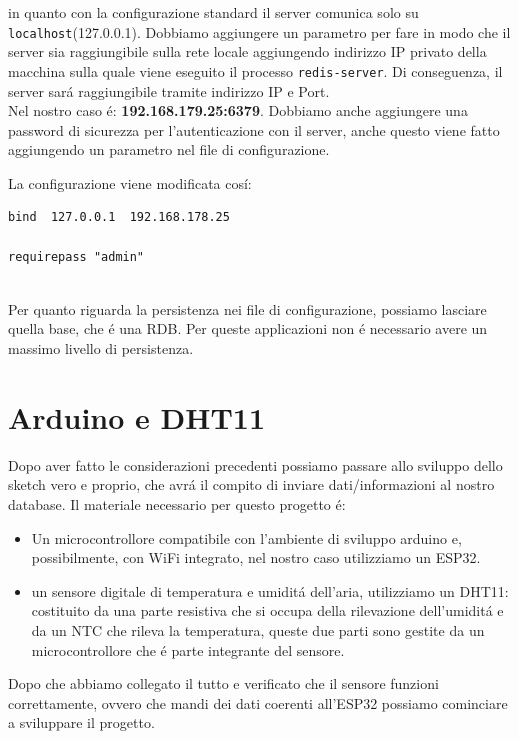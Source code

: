 in quanto con la configurazione standard il server comunica solo su \texttt{localhost}(127.0.0.1).
Dobbiamo aggiungere un parametro per fare in modo che il server sia raggiungibile sulla rete locale aggiungendo indirizzo IP
privato della macchina sulla quale viene eseguito il processo \texttt{redis-server}.
Di conseguenza, il server sará raggiungibile tramite indirizzo IP e Port.\\
Nel nostro caso é: \textbf{192.168.179.25:6379}.
Dobbiamo anche aggiungere una password di sicurezza per l'autenticazione con il server, anche questo viene fatto
aggiungendo un parametro nel file di configurazione.

La configurazione viene modificata cosí:
\begin{lstlisting}[autogobble]
bind  127.0.0.1  192.168.178.25

requirepass "admin"\end{lstlisting}

\\

Per quanto riguarda la persistenza nei file di configurazione, possiamo lasciare quella base, che é una RDB.
Per queste applicazioni non é necessario avere un massimo livello di persistenza.

\section{Arduino e DHT11}
Dopo aver fatto le considerazioni precedenti possiamo passare allo sviluppo dello sketch vero e proprio, che avrá il compito
di inviare dati/informazioni al nostro database.
Il materiale necessario per questo progetto é:
\begin{itemize}
    \item Un microcontrollore compatibile con l'ambiente di sviluppo arduino e, possibilmente, con WiFi integrato,
          nel nostro caso utilizziamo un ESP32.
    \item un sensore digitale di temperatura e umiditá dell'aria, utilizziamo un DHT11: costituito da una parte resistiva
    che si occupa della rilevazione dell'umiditá e da un NTC che rileva la temperatura, queste due parti sono gestite
    da un microcontrollore che é parte integrante del sensore.
\end{itemize}

Dopo che abbiamo collegato il tutto e verificato che il sensore funzioni correttamente, ovvero che mandi dei dati
coerenti all'ESP32 possiamo cominciare a sviluppare il progetto.

